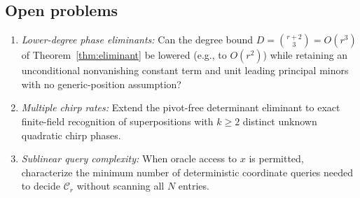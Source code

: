 \documentclass[11pt,reqno]{amsart}
\numberwithin{equation}{section}
\theoremstyle{definition}
\theoremstyle{remark}
\begin{document}
\subsection*{Open problems}
\begin{enumerate}[label=(\arabic*),leftmargin=2em]
\item \emph{Lower-degree phase eliminants:} Can the degree bound $D=\binom{r+2}{3}=O(r^3)$ of Theorem~\ref{thm:eliminant} be lowered (e.g., to $O(r^2)$) while retaining an unconditional nonvanishing constant term and unit leading principal minors with no generic-position assumption?
\item \emph{Multiple chirp rates:} Extend the pivot-free determinant eliminant to exact finite-field recognition of superpositions with $k\ge 2$ distinct unknown quadratic chirp phases.
\item \emph{Sublinear query complexity:} When oracle access to $x$ is permitted, characterize the minimum number of deterministic coordinate queries needed to decide $\mathcal{C}_r$ without scanning all $N$ entries.
\end{enumerate}
\end{document}
